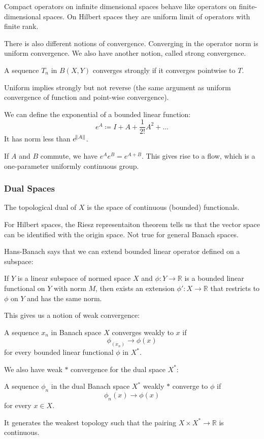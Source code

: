 \documentclass[main.tex]{subfiles}
\begin{document}
Compact operators on infinite dimensional spaces behave like operators on finite-dimensional spaces. On Hilbert spaces they are uniform limit of operators with finite rank.

There is also different notions of convergence. Converging in the operator norm is uniform convergence. We also have another notion, called strong convergence.

\begin{definition}
A sequence $T_n$ in $B(X,Y)$ converges strongly if it converges pointwise to $T$.
\end{definition}
Uniform implies strongly but not reverse (the same argument as uniform convergence of function and point-wise convergence).

We can define the exponential of a bounded linear function:
$$
e^A \coloneqq I + A + \frac{1}{2!}A^2 + ...
$$
It has norm less than $e^{\norm{A}}$.

If $A$ and $B$ commute, we have $e^A e^B = e^{A + B}$. This gives rise to a flow, which is a one-parameter uniformly continuous group. 


\subsubsection{Dual Spaces}
The topological dual of $X$ is the space of continuous (bounded) functionals.

For Hilbert spaces, the Riesz representaiton theorem tells us that the vector space can be identified with the origin space. Not true for general Banach spaces.

Hans-Banach says that we can extend bounded linear operator defined on a subspace:

\begin{theorem}
If $Y$ is a linear subspace of normed space $X$ and $\phi: Y \rightarrow \mathbb{R}$ is a bounded linear functional on $Y$ with norm $M$, then exists an extension $\phi': X \rightarrow \mathbb{R}$ that restricts to $\phi$ on $Y$ and has the same norm.
\end{theorem}

This gives us a notion of weak convergence:
\begin{definition}
A sequence $x_n$ in Banach space $X$ converges weakly to $x$ if 
$$
\phi_(x_n) \rightarrow \phi(x)
$$
for every bounded linear functional $\phi$ in $X^*$.
\end{definition}

We also have weak $*$ convergence for the dual space $X^*$:
\begin{definition}
A sequence $\phi_n$ in the dual Banach space $X^*$ weakly $*$ converge to $\phi$ if
$$
\phi_n(x) \rightarrow \phi(x)
$$
for every $x \in X$.
\end{definition}
It generates the weakest topology such that the pairing $X \times X^* \rightarrow \mathbb{R}$ is continuous.
\end{document}
